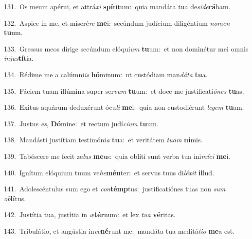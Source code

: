 {\numbfont\textcolor{\numbcolor}{131.}}~Os meum apérui, et attrá\textit{xi} \textbf{spí}\-ritum:~\star quia mandáta tua de\-\textit{si}\-\textit{de}\textbf{rá}bam.\par
{\numbfont\textcolor{\numbcolor}{132.}}~Aspice in me, et miseré\textit{re} \textbf{me}\-i:~\star secúndum judícium diligéntium \textit{no}\-\textit{men} \textbf{tu}\-um.\par
{\numbfont\textcolor{\numbcolor}{133.}}~Gressus meos dírige secúndum elóqui\textit{um} \textbf{tu}\-um:~\star et non dominétur mei omnis \textit{in}\-\textit{jus}\textbf{tí}tia.\par
{\numbfont\textcolor{\numbcolor}{134.}}~Rédime me a calúmni\textit{is} \textbf{hó}\-minum:~\star ut custódiam man\-\textit{dá}\-\textit{ta} \textbf{tu}\-a.\par
{\numbfont\textcolor{\numbcolor}{135.}}~Fáciem tuam illúmina super ser\textit{vum} \textbf{tu}\-um:~\star et doce me justificati\-\textit{ó}\-\textit{nes} \textbf{tu}\-as.\par
{\numbfont\textcolor{\numbcolor}{136.}}~Exitus aquárum deduxérunt ócu\textit{li} \textbf{me}\-i:~\star quia non custodiérunt \textit{le}\-\textit{gem} \textbf{tu}\-am.\par
{\numbfont\textcolor{\numbcolor}{137.}}~Justus \textit{es}\-, \textbf{Dó}\-mine:~\star et rectum judí\-\textit{ci}\-\textit{um} \textbf{tu}\-um.\par
{\numbfont\textcolor{\numbcolor}{138.}}~Mandásti justítiam testimóni\textit{a} \textbf{tu}\-a:~\star et veritátem \textit{tu}\-\textit{am} \textbf{ni}\-mis.\par
{\numbfont\textcolor{\numbcolor}{139.}}~Tabéscere me fecit ze\textit{lus} \textbf{me}\-us:~\star quia oblíti sunt verba tua ini\-\textit{mí}\-\textit{ci} \textbf{me}\-i.\par
{\numbfont\textcolor{\numbcolor}{140.}}~Ignítum elóquium tuum ve\-\textit{he}\-\textbf{mén}ter:~\star et servus tuus di\-\textit{lé}\-\textit{xit} \textbf{il}\-lud.\par
{\numbfont\textcolor{\numbcolor}{141.}}~Adolescéntulus sum ego et \textit{con}\-\textbf{témp}tus:~\star justificatiónes tuas non \textit{sum} \textit{ob}\-\textbf{lí}tus.\par
{\numbfont\textcolor{\numbcolor}{142.}}~Justítia tua, justítia in \textit{æ}\-\textbf{tér}num:~\star et lex \textit{tu}\-\textit{a} \textbf{vé}\-ritas.\par
{\numbfont\textcolor{\numbcolor}{143.}}~Tribulátio, et angústia in\-\textit{ve}\-\textbf{né}runt me:~\star mandáta tua meditá\-\textit{ti}\-\textit{o} \textbf{me}\-a est.\par
